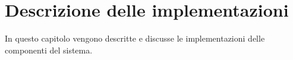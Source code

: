 \clearpage
\chapter{Descrizione delle implementazioni}\label{ch:implementation}
In questo capitolo vengono descritte e discusse le implementazioni delle componenti del sistema.
